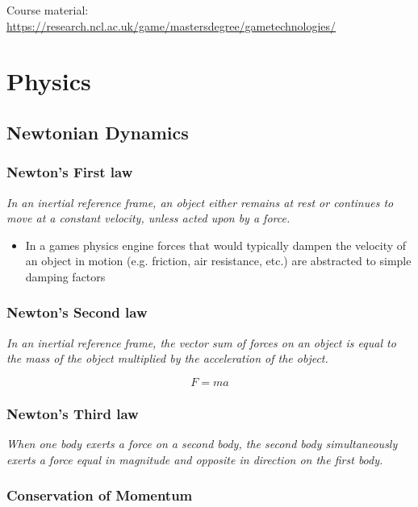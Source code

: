 \documentclass[a4paper]{article}
\begin{document}
\tableofcontents

\vfill
Course material:
\url{https://research.ncl.ac.uk/game/mastersdegree/gametechnologies/}

\section{Physics}

\subsection{Newtonian Dynamics}

\subsubsection{Newton's First law}

\textit{In an inertial reference frame, an object either remains at rest or
continues to move at a constant velocity, unless acted upon by a force.}

\begin{itemize}
  \item
    In a games physics engine forces that would typically dampen the velocity of
    an object in motion (e.g. friction, air resistance, etc.) are abstracted to
    simple damping factors
\end{itemize}

\subsubsection{Newton's Second law}

\textit{In an inertial reference frame, the vector sum of forces on an object is
  equal to the mass of the object multiplied by the acceleration of the object.}

\[
  F = ma
\]

\subsubsection{Newton's Third law}

\textit{When one body exerts a force on a second body, the second body
  simultaneously exerts a force equal in magnitude and opposite in
direction on the first body.}

\subsubsection{Conservation of Momentum}
\end{document}
